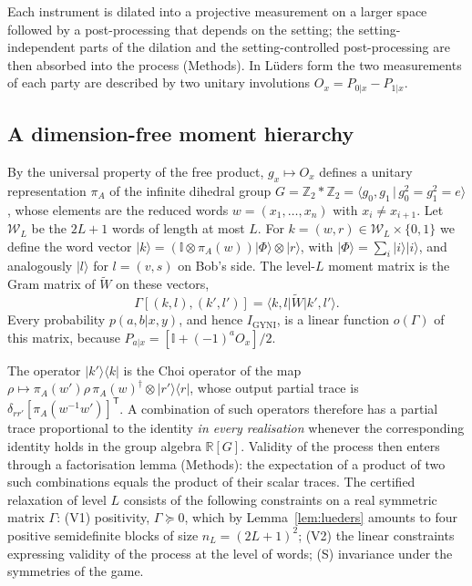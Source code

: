 \documentclass[11pt]{article}
\newcommand{\ket}[1]{\lvert #1\rangle}
\newcommand{\bra}[1]{\langle #1\rvert}
\newcommand{\one}{\mathbb{I}}
\newcommand{\tp}{\mathsf{T}}
\newcommand{\RR}{\mathbb{R}}
\newcommand{\ZZ}{\mathbb{Z}}
\newcommand{\Igy}{I_{\mathrm{GYNI}}}
\newcommand{\cW}{\mathcal{W}}
\begin{document}
Each instrument is dilated into a projective measurement on a larger space followed by a post-processing that depends on the setting; the setting-independent parts of the dilation and the setting-controlled post-processing are then absorbed into the process (Methods). In L\"uders form the two measurements of each party are described by two unitary involutions $O_x=P_{0|x}-P_{1|x}$.

\subsection*{A dimension-free moment hierarchy}
By the universal property of the free product, $g_x\mapsto O_x$ defines a unitary representation $\pi_A$ of the infinite dihedral group $G=\ZZ_2*\ZZ_2=\langle g_0,g_1\,|\,g_0^2=g_1^2=e\rangle$, whose elements are the reduced words $w=(x_1,\dots,x_n)$ with $x_i\neq x_{i+1}$. Let $\cW_L$ be the $2L+1$ words of length at most $L$. For $k=(w,r)\in\cW_L\times\{0,1\}$ we define the word vector $\ket{k}=(\one\otimes\pi_A(w))\ket{\Phi}\otimes\ket{r}$, with $\ket{\Phi}=\sum_i\ket{i}\ket{i}$, and analogously $\ket{l}$ for $l=(v,s)$ on Bob's side. The level-$L$ moment matrix is the Gram matrix of $\widetilde W$ on these vectors,
\begin{equation}
\Gamma[(k,l),(k',l')]=\bra{k,l}\widetilde W\ket{k',l'} .
\label{eq:gamma}
\end{equation}
Every probability $p(a,b|x,y)$, and hence $\Igy$, is a linear function $o(\Gamma)$ of this matrix, because $P_{a|x}=[\one+(-1)^aO_x]/2$.

The operator $\ket{k'}\bra{k}$ is the Choi operator of the map $\rho\mapsto\pi_A(w')\rho\,\pi_A(w)^\dagger\otimes\ket{r'}\bra{r}$, whose output partial trace is $\delta_{rr'}[\pi_A(w^{-1}w')]^\tp$. A combination of such operators therefore has a partial trace proportional to the identity \emph{in every realisation} whenever the corresponding identity holds in the group algebra $\RR[G]$. Validity of the process then enters through a factorisation lemma (Methods): the expectation of a product of two such combinations equals the product of their scalar traces. The certified relaxation of level $L$ consists of the following constraints on a real symmetric matrix $\Gamma$:
(V1) positivity, $\Gamma\succeq0$, which by Lemma~\ref{lem:lueders} amounts to four positive semidefinite blocks of size $n_L=(2L+1)^2$;
(V2) the linear constraints expressing validity of the process at the level of words;
(S) invariance under the symmetries of the game.
\end{document}
